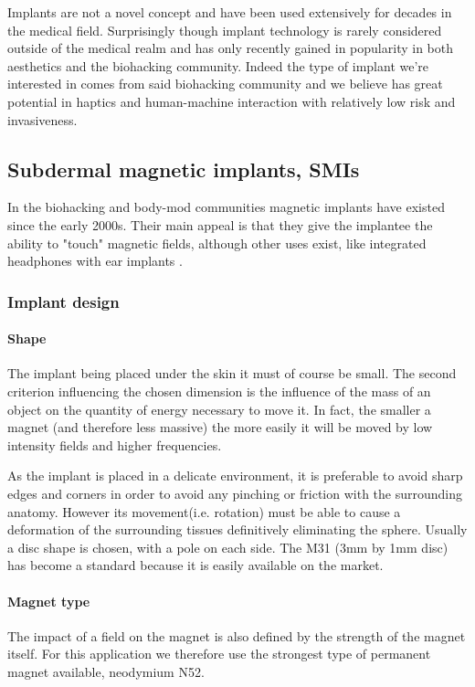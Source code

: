 \documentclass[10pt,journal,compsoc]{IEEEtran}
\begin{document}
	Implants are not a novel concept and have been used extensively for decades in the medical field. Surprisingly though implant technology is rarely considered outside of the medical realm and has only recently gained in popularity in both aesthetics and the biohacking community.
	Indeed the type of implant we're interested in comes from said biohacking community and we believe has great potential in haptics and human-machine interaction with relatively low risk and invasiveness.
	
	
	\subsection{Subdermal magnetic implants, SMIs}
		In the biohacking and body-mod communities magnetic implants have existed since the early 2000s. Their main appeal is that they give the implantee the ability to "touch" magnetic fields, although other uses exist, like integrated headphones with ear implants \cite{fougues2020book}.
		\subsubsection{Implant design} 
			\paragraph{Shape}
			The implant being placed under the skin it must of course be small. The second criterion influencing the chosen dimension is the influence of the mass of an object on the quantity of energy necessary to move it. In fact, the smaller a magnet (and therefore less massive) the more easily it will be moved by low intensity fields and higher frequencies.
			
			As the implant is placed in a delicate environment, it is preferable to avoid sharp edges and corners in order to avoid any pinching or friction with the surrounding anatomy. However its movement(i.e. rotation) must be able to cause a deformation of the surrounding tissues definitively eliminating the sphere. Usually a disc shape is chosen, with a pole on each side.
			The M31 (3mm by 1mm disc) has become a standard because it is easily available on the market.
			\paragraph{Magnet type}
			The impact of a field on the magnet is also defined by the strength of the magnet itself. For this application we therefore use the strongest type of permanent magnet available, neodymium N52.
\end{document}
